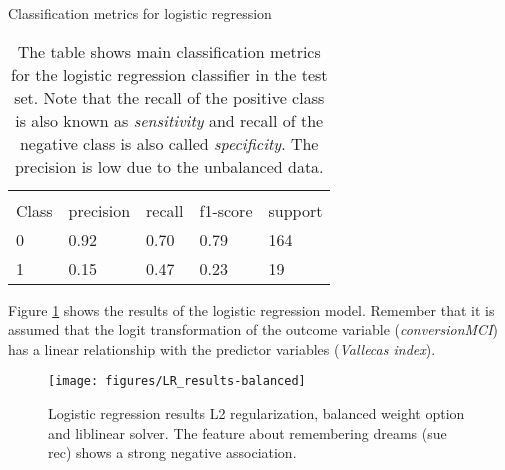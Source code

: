\documentclass[11pt]{article}
\theoremstyle{definition}
\theoremstyle{remark}
\begin{document}
\begin{table}[H]
\caption{Classification metrics for logistic regression} \label{tab:logreg} 
\begin{center} 
\begin{tabular}{lllll}
\hline
\multicolumn{1}{c}{} \\
Class & precision & recall & f1-score & support     \\
\hline
0 & 0.92  &    0.70   &   0.79   &    164 \\
1 & 0.15  &    0.47   &   0.23   &     19 \\
\hline
\end{tabular}
\caption{The table shows  main classification metrics for the logistic regression classifier in the test set. Note that the recall of the positive class is also known as \emph{sensitivity} and recall of the negative class is also called \emph{specificity}. The precision is low due to the unbalanced data.}
\end{center}
\end{table}


Figure \ref{fig:logresres} shows the results of the logistic regression model. Remember that it is assumed that the logit transformation of the outcome variable (\emph{conversionMCI}) has a linear relationship with the predictor variables (\emph{Vallecas index}).

\begin{figure}[H]
        \centering
        \texttt{[image: figures/LR\_results-balanced]}
        \caption{Logistic regression results L2 regularization, balanced weight option and liblinear solver. The feature about remembering dreams (sue rec) shows a strong negative association.} \label{fig:logresres}
\end{figure}
\end{document}
